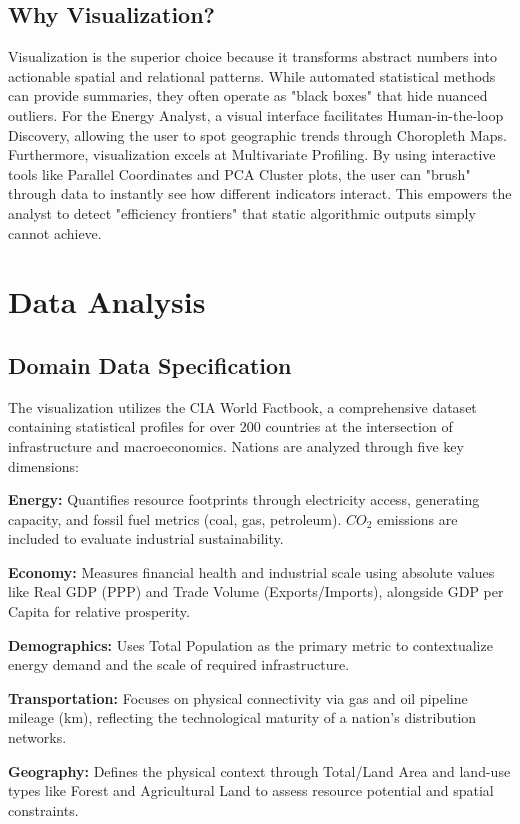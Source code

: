\documentclass[conference]{IEEEtran}
\begin{document}
\subsection{Why Visualization?}
Visualization is the superior choice because it transforms abstract numbers into actionable spatial and relational patterns. While automated statistical methods can provide summaries, they often operate as "black boxes" that hide nuanced outliers. For the Energy Analyst, a visual interface facilitates Human-in-the-loop Discovery, allowing the user to spot geographic trends through Choropleth Maps. Furthermore, visualization excels at Multivariate Profiling. By using interactive tools like Parallel Coordinates and PCA Cluster plots, the user can "brush" through data to instantly see how different indicators interact. This empowers the analyst to detect "efficiency frontiers" that static algorithmic outputs simply cannot achieve.

\section{Data Analysis}

\subsection{Domain Data Specification}
The visualization utilizes the CIA World Factbook, a comprehensive dataset containing statistical profiles for over 200 countries at the intersection of infrastructure and macroeconomics. Nations are analyzed through five key dimensions:

\textbf{Energy:} Quantifies resource footprints through electricity access, generating capacity, and fossil fuel metrics (coal, gas, petroleum). $CO_2$ emissions are included to evaluate industrial sustainability.

\textbf{Economy:} Measures financial health and industrial scale using absolute values like Real GDP (PPP) and Trade Volume (Exports/Imports), alongside GDP per Capita for relative prosperity.

\textbf{Demographics:} Uses Total Population as the primary metric to contextualize energy demand and the scale of required infrastructure.

\textbf{Transportation:} Focuses on physical connectivity via gas and oil pipeline mileage (km), reflecting the technological maturity of a nation’s distribution networks.

\textbf{Geography:} Defines the physical context through Total/Land Area and land-use types like Forest and Agricultural Land to assess resource potential and spatial constraints.
\end{document}
